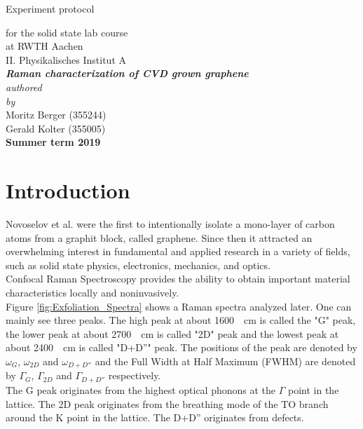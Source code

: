 \documentclass[12pt,a4paper]{article}
\author{Gerald}
\begin{document}
	\setlength{\parindent}{0pt} 
	\begin{center}
		{\LARGE Experiment protocol}\\
		\begin{large}
			for the solid state lab course\\[0.4cm]
			at RWTH Aachen\\
			II. Physikalisches Institut A\\[5.5cm]
			\Large\textbf{\textsl{Raman characterization of CVD grown graphene}}\\[5.5cm]
			\normalsize\textit{authored\\by}\\[0.4cm]
			\large{Moritz Berger (355244)\\Gerald Kolter (355005)}\\[2cm]
			\large \textbf{Summer term 2019}
		\end{large}
	\end{center}
	\newpage
	
	\tableofcontents
	\newpage

\section{Introduction}
Novoselov et al. were the first to intentionally isolate a mono-layer of carbon atoms from a graphit block, called graphene.\cite{Novoselov2004} Since then it attracted an overwhelming interest in fundamental and applied research in a variety of fields, such as solid state physics, electronics, mechanics, and optics.\cite{NeumannStampfer} \\
Confocal Raman Spectroscopy provides the ability to obtain important material characteristics locally and noninvasively.\cite{NeumannStampfer} \\
Figure \ref{fig:Exfoliation_Spectra} shows a Raman spectra analyzed later. One can mainly see three peaks. The high peak at about \SI{1600}{\per cm} is called the "G" peak, the lower peak at about \SI{2700}{\per cm} is called "2D" peak and the lowest peak at about \SI{2400}{\per cm} is called "D+D''" peak. The positions of the peak are denoted by $\omega _G$, $\omega _{2D}$ and $\omega _{D+D''}$ and the Full Width at Half Maximum (FWHM) are denoted by $\Gamma _G$, $\Gamma _{2D}$ and $\Gamma _{D+D''}$ respectively. \\
The G peak originates from the highest optical phonons at the $\Gamma$ point in the lattice. The 2D peak originates from the breathing mode of the TO branch around the K point in the lattice. The D+D'' originates from defects\cite{NeumannStampfer}.
\end{document}
